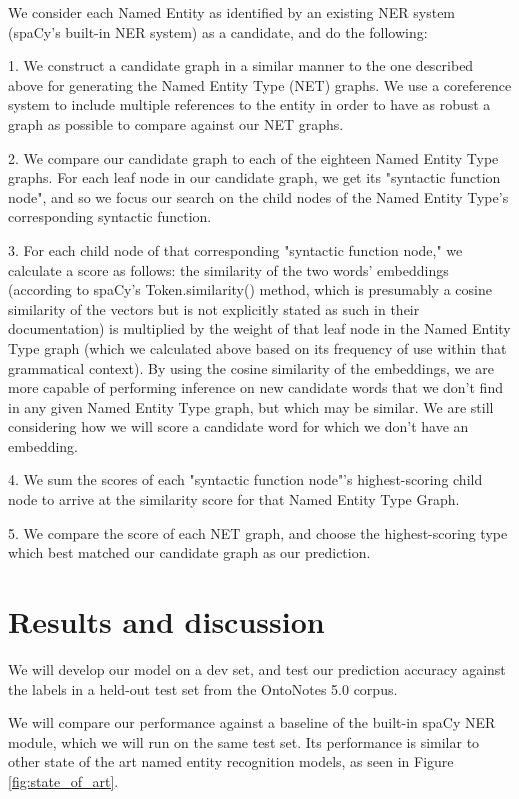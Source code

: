 \documentclass[11pt,a4paper]{article}
\begin{document}
We consider each Named Entity as identified by an existing NER system (spaCy's built-in NER system) as a candidate, and do the following:

1. We construct a candidate graph in a similar manner to the one described above for generating the Named Entity Type (NET) graphs. We use a coreference system to include multiple references to the entity in order to have as robust a graph as possible to compare against our NET graphs.

2. We compare our candidate graph to each of the eighteen Named Entity Type graphs. For each leaf node in our candidate graph, we get its "syntactic function node", and so we focus our search on the child nodes of the Named Entity Type's corresponding syntactic function.

3. For each child node of that corresponding "syntactic function node," we calculate a score as follows: the similarity of the two words' embeddings (according to spaCy's Token.similarity() method, which is presumably a cosine similarity of the vectors but is not explicitly stated as such in their documentation) is multiplied by the weight of that leaf node in the Named Entity Type graph (which we calculated above based on its frequency of use within that grammatical context). By using the cosine similarity of the embeddings, we are more capable of performing inference on new candidate words that we don't find in any given Named Entity Type graph, but which may be similar. We are still considering how we will score a candidate word for which we don't have an embedding.

4. We sum the scores of each "syntactic function node"'s highest-scoring child node to arrive at the similarity score for that Named Entity Type Graph.

5. We compare the score of each NET graph, and choose the highest-scoring type which best matched our candidate graph as our prediction.


\section{Results and discussion}

We will develop our model on a dev set, and test our prediction accuracy against the labels in a held-out test set from the OntoNotes 5.0 corpus.

We will compare our performance against a baseline of the built-in spaCy NER module, which we will run on the same test set. Its performance is similar to other state of the art named entity recognition models, as seen in Figure \ref{fig:state_of_art}.
\end{document}
